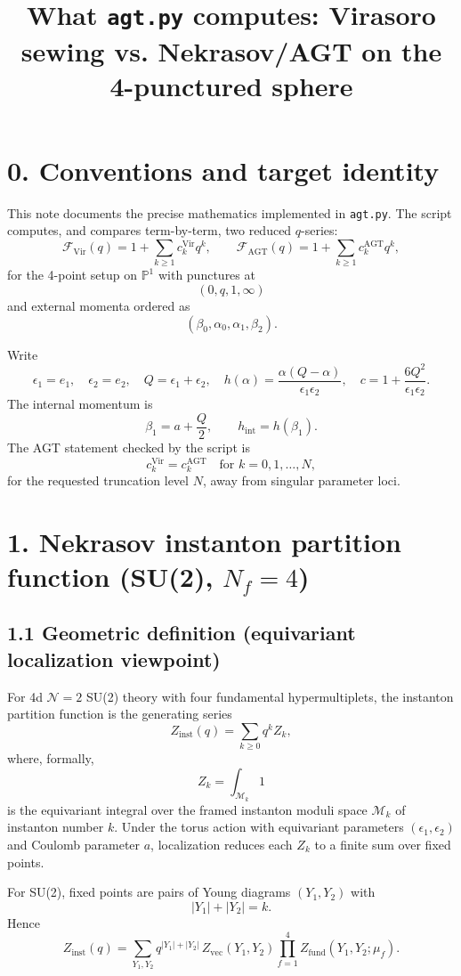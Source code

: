 \documentclass[11pt]{article}
\title{What \texttt{agt.py} computes: Virasoro sewing vs. Nekrasov/AGT on the 4-punctured sphere}
\author{}
\date{}
\begin{document}
\maketitle

\section*{0. Conventions and target identity}

This note documents the precise mathematics implemented in \texttt{agt.py}. The script computes, and compares term-by-term, two reduced $q$-series:
\[
\mathcal F_{\mathrm{Vir}}(q)=1+\sum_{k\ge1}c^{\mathrm{Vir}}_k q^k,
\qquad
\mathcal F_{\mathrm{AGT}}(q)=1+\sum_{k\ge1}c^{\mathrm{AGT}}_k q^k,
\]
for the 4-point setup on $\mathbb P^1$ with punctures at
\[
(0,q,1,\infty)
\]
and external momenta ordered as
\[
(\beta_0,\alpha_0,\alpha_1,\beta_2).
\]

Write
\[
\epsilon_1=e_1,\quad \epsilon_2=e_2,\quad Q=\epsilon_1+\epsilon_2,
\quad
h(\alpha)=\frac{\alpha(Q-\alpha)}{\epsilon_1\epsilon_2},
\quad
c=1+\frac{6Q^2}{\epsilon_1\epsilon_2}.
\]
The internal momentum is
\[
\beta_1=a+\frac Q2,
\qquad
h_{\mathrm{int}}=h(\beta_1).
\]
The AGT statement checked by the script is
\[
c^{\mathrm{Vir}}_k=c^{\mathrm{AGT}}_k\quad \text{for }k=0,1,\dots,N,
\]
for the requested truncation level $N$, away from singular parameter loci.

\section*{1. Nekrasov instanton partition function (SU(2), $N_f=4$)}

\subsection*{1.1 Geometric definition (equivariant localization viewpoint)}

For 4d $\mathcal N=2$ SU(2) theory with four fundamental hypermultiplets, the instanton partition function is the generating series
\[
Z_{\mathrm{inst}}(q)
=\sum_{k\ge0}q^k Z_k,
\]
where, formally,
\[
Z_k
=\int_{\mathcal M_k}1
\]
is the equivariant integral over the framed instanton moduli space $\mathcal M_k$ of instanton number $k$.
Under the torus action with equivariant parameters $(\epsilon_1,\epsilon_2)$ and Coulomb parameter $a$, localization reduces each $Z_k$ to a finite sum over fixed points.

For SU(2), fixed points are pairs of Young diagrams $(Y_1,Y_2)$ with
\[
|Y_1|+|Y_2|=k.
\]
Hence
\[
Z_{\mathrm{inst}}(q)
=\sum_{Y_1,Y_2}q^{|Y_1|+|Y_2|}
\,Z_{\mathrm{vec}}(Y_1,Y_2)
\prod_{f=1}^4 Z_{\mathrm{fund}}(Y_1,Y_2;\mu_f).
\]
\end{document}
